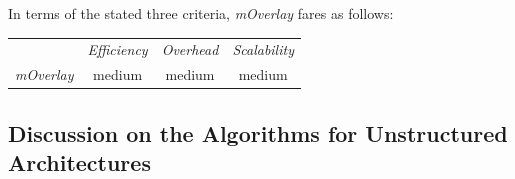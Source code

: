 %
In terms of the stated three criteria, \emph{mOverlay} fares as follows:
\begin{center}
{\footnotesize
\begin{tabular}{rccc}
\multicolumn{1}{r}{} &
\multicolumn{1}{c}{\emph{Efficiency}} &
\multicolumn{1}{c}{\emph{Overhead}} &
\multicolumn{1}{c}{\emph{Scalability}}
\\
\cline{2-4}
\emph{mOverlay} &
medium &
medium &
medium
\end{tabular}
}
\end{center}

\subsection{Discussion on the Algorithms for Unstructured Architectures}




